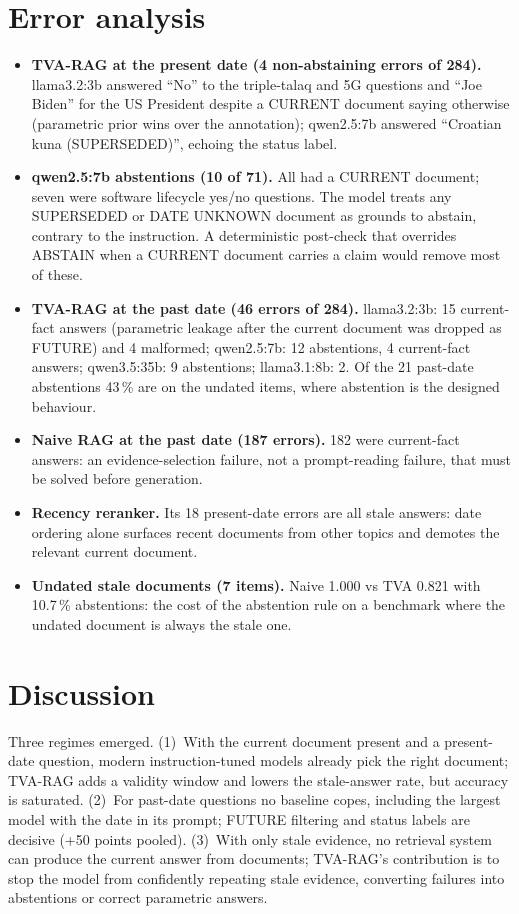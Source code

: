\documentclass[11pt,a4paper]{report}
\begin{document}
\section{Error analysis}
\begin{itemize}[leftmargin=1.4em]
  \item \textbf{TVA-RAG at the present date (4 non-abstaining errors of 284).} llama3.2:3b answered ``No'' to the triple-talaq and 5G questions and ``Joe Biden'' for the US President despite a CURRENT document saying otherwise (parametric prior wins over the annotation); qwen2.5:7b answered ``Croatian kuna (SUPERSEDED)'', echoing the status label.
  \item \textbf{qwen2.5:7b abstentions (10 of 71).} All had a CURRENT document; seven were software lifecycle yes/no questions. The model treats any SUPERSEDED or DATE UNKNOWN document as grounds to abstain, contrary to the instruction. A deterministic post-check that overrides ABSTAIN when a CURRENT document carries a claim would remove most of these.
  \item \textbf{TVA-RAG at the past date (46 errors of 284).} llama3.2:3b: 15 current-fact answers (parametric leakage after the current document was dropped as FUTURE) and 4 malformed; qwen2.5:7b: 12 abstentions, 4 current-fact answers; qwen3.5:35b: 9 abstentions; llama3.1:8b: 2. Of the 21 past-date abstentions 43\,\% are on the undated items, where abstention is the designed behaviour.
  \item \textbf{Naive RAG at the past date (187 errors).} 182 were current-fact answers: an evidence-selection failure, not a prompt-reading failure, that must be solved before generation.
  \item \textbf{Recency reranker.} Its 18 present-date errors are all stale answers: date ordering alone surfaces recent documents from other topics and demotes the relevant current document.
  \item \textbf{Undated stale documents (7 items).} Naive 1.000 vs TVA 0.821 with 10.7\,\% abstentions: the cost of the abstention rule on a benchmark where the undated document is always the stale one.
\end{itemize}

\section{Discussion}
Three regimes emerged. (1)~With the current document present and a present-date question, modern instruction-tuned models already pick the right document; TVA-RAG adds a validity window and lowers the stale-answer rate, but accuracy is saturated. (2)~For past-date questions no baseline copes, including the largest model with the date in its prompt; FUTURE filtering and status labels are decisive (+50 points pooled). (3)~With only stale evidence, no retrieval system can produce the current answer from documents; TVA-RAG's contribution is to stop the model from confidently repeating stale evidence, converting failures into abstentions or correct parametric answers.
\end{document}
